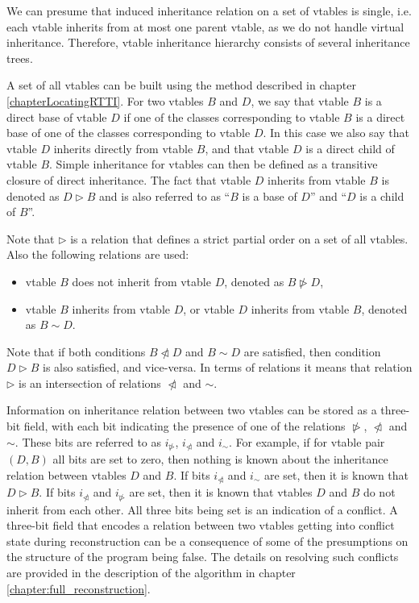 \documentclass[10pt, conference]{IEEEtran}
\newcommand{\inrhd}{i_{\nrhd}}
\newcommand{\inlhd}{i_{\nlhd}}
\newcommand{\isim}{i_{\sim}}
\newcommand{\nlhd}{\ntriangleleft}
\newcommand{\nrhd}{\ntriangleright}
\newcommand{\compact}{}
\begin{document}
We can presume that induced inheritance relation on a set of vtables is single,
i.e. each vtable inherits from at most one parent vtable,
as we do not handle virtual inheritance. Therefore, vtable inheritance hierarchy
consists of several inheritance trees.

A set of all vtables
can be built using the method described in chapter \ref{chapterLocatingRTTI}.
For two vtables $B$ and $D$, we say that vtable $B$ is a direct base of vtable $D$ if
one of the classes corresponding to vtable $B$ is a direct base of one of
the classes corresponding to vtable $D$.
In this case we also say that vtable $D$ inherits directly from vtable $B$,
and that vtable $D$ is a direct child of vtable $B$.
Simple inheritance for vtables can then be defined as a transitive
closure of direct inheritance. The fact that vtable $D$ inherits
from vtable $B$ is denoted as $D \rhd B$ and is also referred to as
``$B$ is a base of $D$'' and ``$D$ is a child of $B$''.

Note that $\rhd$ is a relation that defines a strict partial order on
a set of all vtables. Also the following relations are used:
\begin{itemize}\compact
\item vtable $B$ does not inherit from vtable $D$, denoted as $B \nrhd D$,
\item vtable $B$ inherits from vtable $D$, or vtable $D$ inherits from vtable $B$, denoted as $B \sim D$.
\end{itemize}

Note that if both conditions $B \nlhd D$ and $B \sim D$ are satisfied,
then condition $D \rhd B$ is also satisfied, and vice-versa. In terms
of relations it means that relation $\rhd$ is an intersection
of relations $\nlhd$ and $\sim$.

Information on inheritance relation between two vtables
can be stored as a three-bit field, with each bit indicating the
presence of one of the relations $\nrhd$, $\nlhd$ and $\sim$.
These bits are referred to as $\inrhd$, $\inlhd$ and $\isim$.
For example, if for vtable pair $(D, B)$ all bits are set to zero,
then nothing is known about the inheritance relation between vtables $D$ and $B$.
If bits $\inlhd$ and $\isim$ are set, then it is known that $D \rhd B$.
If bits $\inlhd$ and $\inrhd$ are set, then it is known that vtables
$D$ and $B$ do not inherit from each other.
All three bits being set is an indication of a conflict.
A three-bit field that encodes a relation between two vtables getting into
conflict state during reconstruction can be a consequence of some of the
presumptions on the structure of the program being false. 
The details on resolving such conflicts are provided in the description
of the algorithm in chapter \ref{chapter:full_reconstruction}.
\end{document}
